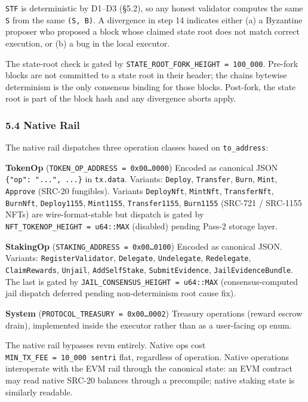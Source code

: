 \documentclass[11pt,a4paper]{article}
\begin{document}
\texttt{STF} is deterministic by D1--D3 (§5.2), so any honest validator
computes the same \texttt{S\textquotesingle{}} from the same
\texttt{(S,\ B)}. A divergence in step 14 indicates either (a) a
Byzantine proposer who proposed a block whose claimed state root does
not match correct execution, or (b) a bug in the local executor.

The state-root check is gated by
\texttt{STATE\_ROOT\_FORK\_HEIGHT\ =\ 100\_000}. Pre-fork blocks are not
committed to a state root in their header; the chain\textquotesingle s
bytewise determinism is the only consensus binding for those blocks.
Post-fork, the state root is part of the block hash and any divergence
aborts apply.

\hypertarget{54-native-rail}{%
\subsubsection{5.4 Native Rail}\label{54-native-rail}}

The native rail dispatches three operation classes based on
\texttt{to\_address}:

\textbf{TokenOp} (\texttt{TOKEN\_OP\_ADDRESS\ =\ 0x00…0000}) Encoded as
canonical JSON \texttt{\{"op":\ "...",\ ...\}} in \texttt{tx.data}.
Variants: \texttt{Deploy}, \texttt{Transfer}, \texttt{Burn},
\texttt{Mint}, \texttt{Approve} (SRC-20 fungibles). Variants
\texttt{DeployNft}, \texttt{MintNft}, \texttt{TransferNft},
\texttt{BurnNft}, \texttt{Deploy1155}, \texttt{Mint1155},
\texttt{Transfer1155}, \texttt{Burn1155} (SRC-721 / SRC-1155 NFTs) are
wire-format-stable but dispatch is gated by
\texttt{NFT\_TOKENOP\_HEIGHT\ =\ u64::MAX} (disabled) pending Pass-2
storage layer.

\textbf{StakingOp} (\texttt{STAKING\_ADDRESS\ =\ 0x00…0100}) Encoded as
canonical JSON. Variants: \texttt{RegisterValidator}, \texttt{Delegate},
\texttt{Undelegate}, \texttt{Redelegate}, \texttt{ClaimRewards},
\texttt{Unjail}, \texttt{AddSelfStake}, \texttt{SubmitEvidence},
\texttt{JailEvidenceBundle}. The last is gated by
\texttt{JAIL\_CONSENSUS\_HEIGHT\ =\ u64::MAX} (consensus-computed jail
dispatch deferred pending non-determinism root cause fix).

\textbf{System} (\texttt{PROTOCOL\_TREASURY\ =\ 0x00…0002}) Treasury
operations (reward escrow drain), implemented inside the executor rather
than as a user-facing op enum.

The native rail bypasses revm entirely. Native ops cost
\texttt{MIN\_TX\_FEE\ =\ 10\_000\ sentri} flat, regardless of operation.
Native operations interoperate with the EVM rail through the canonical
state: an EVM contract may read native SRC-20 balances through a
precompile; native staking state is similarly readable.
\end{document}

